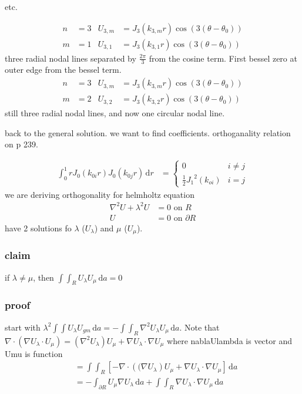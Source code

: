 \documentclass{article}
\begin{document}
etc.

\begin{align*}
  n&=3&U_{3,m}&=J_{3}(k_{3,m}r)\cos(3(\theta-\theta_0))\\
  m&=1&U_{3,1}&=J_3(k_{3,1}r)\cos(3(\theta-\theta_0))
\end{align*}
three radial nodal lines separated by $\frac{2\pi}{3}$ from the cosine term. First bessel zero at outer edge from the bessel term.
\begin{align*}
  n&=3&U_{3,m}&=J_{3}(k_{3,m}r)\cos(3(\theta-\theta_0))\\
  m&=2&U_{3,2}&=J_3(k_{3,2}r)\cos(3(\theta-\theta_0))
\end{align*}
still three radial nodal lines, and now one circular nodal line.

back to the general solution. we want to find coefficients. orthoganality relation on p 239.

\begin{align*}
  \int_0^1{rJ_0(k_{0i}r)J_0(k_{0j}r)\,\mathrm{d}r}&=\begin{cases}0&i\ne j\\\frac{1}{2}{J_1}^2(k_{oi})&i=j\end{cases}
\end{align*}
we are deriving orthogonality for helmholtz equation
\begin{align*}
  \nabla^2U+\lambda^2U&=0\text{ on }R\\
  U&=0\text{ on }\partial R
\end{align*}
have 2 solutions fo $\lambda$ ($U_\lambda$) and $\mu$ ($U_\mu$).
\subsubsection*{claim} if $\lambda\ne\mu$, then $\int\int_R{U_\lambda U_\mu\,\mathrm{d}a}=0$
\subsubsection*{proof}
start with  $\lambda^2\int\int{U_\lambda U_{gm}\,\mathrm{d}a}=-\int\int_R{\nabla^2U_\lambda U_\mu\,\mathrm{d}a}$. Note that $\nabla\cdot(\nabla U_\lambda\cdot U_\mu)=(\nabla^2U_\lambda)U_\mu+\nabla U_\lambda\cdot \nabla U_\mu$ where nablaUlambda is vector and Umu is function
\begin{align*}
  &=\int\int_R{\left[-\nabla\cdot\left((\nabla U_\lambda\right)U_\mu+\nabla U_\lambda\cdot\nabla U_\mu\right]\,\mathrm{d}a}\\
  &=-\int_{\partial R}{U_\mu \nabla U_\lambda\,\mathrm{d}a}+\int\int_R{\nabla U_\lambda\cdot\nabla U_\mu\,\mathrm{d}a}\\
\end{align*}
\end{document}
